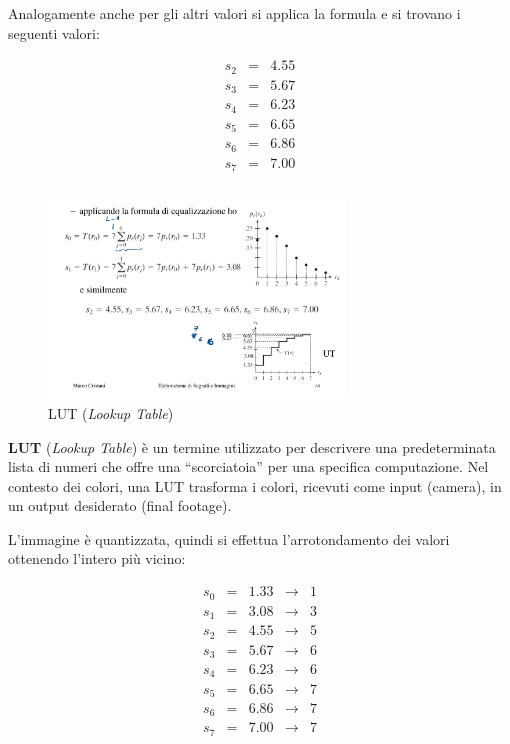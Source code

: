 \documentclass[a4paper]{article}
\newcommand{\dquotes}[1]{``#1''}
\begin{document}
	\noindent
	Analogamente anche per gli altri valori si applica la formula e si trovano i seguenti valori:
	
	\begin{equation*}
		\begin{array}{lll}
			s_{2} & = & 4.55 \\
			s_{3} & = & 5.67 \\
			s_{4} & = & 6.23 \\
			s_{5} & = & 6.65 \\
			s_{6} & = & 6.86 \\
			s_{7} & = & 7.00 \\
		\end{array}
	\end{equation*}

	\begin{figure}[!htp]
		\centering
		\includegraphics[width=0.7\textwidth]{img/eg_equalizzazione.pdf}
		\caption{LUT (\emph{Lookup Table})}
	\end{figure}

	\noindent
	\textbf{LUT} (\emph{Lookup Table}) è un termine utilizzato per descrivere una predeterminata lista di numeri che offre una \dquotes{scorciatoia} per una specifica computazione. Nel contesto dei colori, una LUT trasforma i colori, ricevuti come input (camera), in un output desiderato (final footage).\newline
	
	\noindent
	L'immagine è quantizzata, quindi si effettua l'arrotondamento dei valori ottenendo l'intero più vicino:
	
	\begin{equation*}
		\begin{array}{lllll}
			s_{0} & = & 1.33 & \longrightarrow & 1 \\
			s_{1} & = & 3.08 & \longrightarrow & 3 \\
			s_{2} & = & 4.55 & \longrightarrow & 5 \\
			s_{3} & = & 5.67 & \longrightarrow & 6 \\
			s_{4} & = & 6.23 & \longrightarrow & 6 \\
			s_{5} & = & 6.65 & \longrightarrow & 7 \\
			s_{6} & = & 6.86 & \longrightarrow & 7 \\
			s_{7} & = & 7.00 & \longrightarrow & 7 \\
		\end{array}
	\end{equation*}
\end{document}
